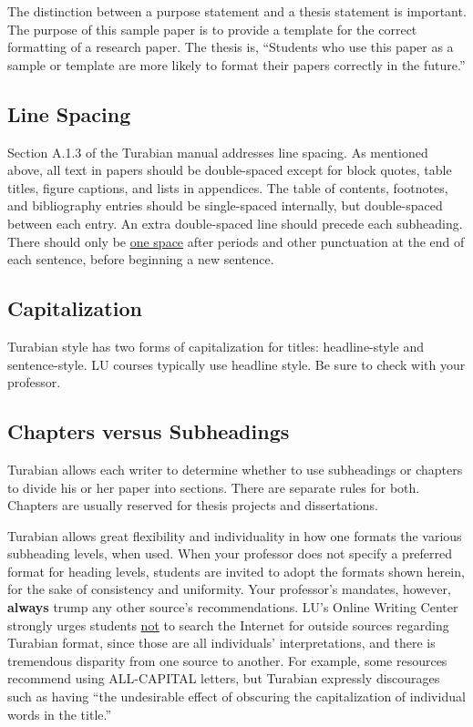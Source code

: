 \documentclass[raggedright]{turabian-researchpaper}
\begin{document}
The distinction between a purpose statement and a thesis statement is important.
The purpose of this sample paper is to provide a template for the correct
formatting of a research paper. The thesis is, ``Students who use this paper as
a sample or template are more likely to format their papers correctly in the
future.''

\subsection{Line Spacing}

Section A.1.3 of the Turabian manual addresses line
spacing.\autocite[373]{Turabian} As mentioned above, all text in papers should
be double-spaced except for block quotes, table titles, figure captions, and
lists in appendices. The table of contents, footnotes, and bibliography entries
should be single-spaced internally, but double-spaced between each
entry.\autocite[373]{Turabian} An extra double-spaced line should precede each
subheading. There should only be \ul{one space} after periods and other
punctuation at the end of each sentence, before beginning a new
sentence.\autocite[373]{Turabian}

\subsection{Capitalization}

Turabian style has two forms of capitalization for titles: headline-style and
sentence-style.\autocite[312]{Turabian} LU courses typically use headline style.
Be sure to check with your professor.

\subsection{Chapters versus Subheadings}

Turabian allows each writer to determine whether to use subheadings or chapters
to divide his or her paper into sections. There are separate rules for both.
Chapters are usually reserved for thesis projects and dissertations.

Turabian allows great flexibility and individuality in how one formats the
various subheading levels, when used. When your professor does not specify a
preferred format for heading levels, students are invited to adopt the formats
shown herein, for the sake of consistency and uniformity. Your professor's
mandates, however, \textbf{always} trump any other source's recommendations.
LU's Online Writing Center strongly urges students \ul{not} to search the
Internet for outside sources regarding Turabian format, since those are all
individuals' interpretations, and there is tremendous disparity from one source
to another. For example, some resources recommend using ALL-CAPITAL letters, but
Turabian expressly discourages such as having ``the undesirable effect of
obscuring the capitalization of individual words in the
title.''\autocite[375]{Turabian}
\end{document}
